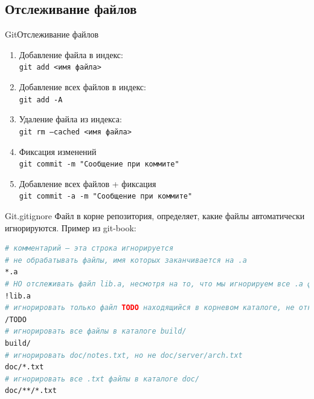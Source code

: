 \documentclass[10pt]{beamer}
\begin{document}
\subsection{Отслеживание файлов}
\begin{frame}[fragile]{Git}{Отслеживание файлов}
\begin{enumerate}
\item Добавление файла в индекс:\\
\texttt{git add <имя файла> }\\
\item Добавление всех файлов в индекс:\\
\texttt{git add -A }\\
\item Удаление файла из индекса:\\
\texttt{git rm ---cached <имя файла> }\\
\item Фиксация изменений\\
\texttt{git commit -m "Сообщение при коммите" }\\
\item Добавление всех файлов + фиксация\\
\texttt{git commit -a -m "Сообщение при коммите" }\\
\end{enumerate}
\end{frame}

\begin{frame}[fragile]{Git}{.gitignore}
Файл в корне репозитория, определяет, какие файлы автоматически игнорируются.
Пример из git-book:
\begin{lstlisting}[language=bash]
# комментарий — эта строка игнорируется
# не обрабатывать файлы, имя которых заканчивается на .a
*.a
# НО отслеживать файл lib.a, несмотря на то, что мы игнорируем все .a файлы с помощью предыдущего правила
!lib.a
# игнорировать только файл TODO находящийся в корневом каталоге, не относится к файлам вида subdir/TODO
/TODO
# игнорировать все файлы в каталоге build/
build/
# игнорировать doc/notes.txt, но не doc/server/arch.txt
doc/*.txt
# игнорировать все .txt файлы в каталоге doc/
doc/**/*.txt
\end{lstlisting}
\end{frame}
\end{document}
